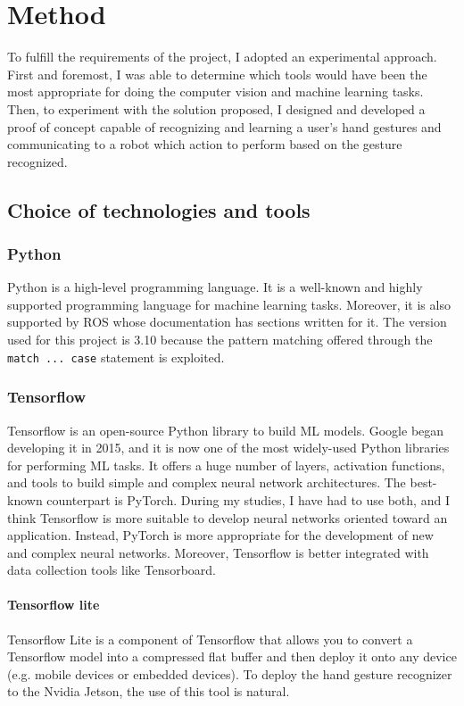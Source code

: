 \documentclass[../thesis.tex]{subfiles}
\begin{document}
\chapter{Method}\label{cap:methods}
To fulfill the requirements of the project, I adopted an experimental approach. First and foremost, I was able to determine which tools would have been the most appropriate for doing the computer vision and machine learning tasks. Then, to experiment with the solution proposed, I designed and developed a proof of concept capable of recognizing and learning a user’s hand gestures and communicating to a robot which action to perform based on the gesture recognized. 
\section{Choice of technologies and tools}\label{sec:technologies_and_tolls}
\subsection{Python}
Python is a high-level programming language. It is a well-known and highly supported programming language for machine learning tasks. Moreover, it is also supported by \acrshort{ROS} whose documentation has sections written for it. The version used for this project is 3.10 because the pattern matching offered through the \texttt{match ... case} statement is exploited.

\subsection{Tensorflow}
Tensorflow is an open-source Python library to build \acrshort{ML} models. Google began developing it in 2015, and it is now one of the most widely-used Python libraries for performing \acrshort{ML} tasks. It offers a huge number of layers, activation functions, and tools to build simple and complex neural network architectures. The best-known counterpart is PyTorch. During my studies, I have had to use both, and I think Tensorflow is more suitable to develop neural networks oriented toward an application. Instead, PyTorch is more appropriate for the development of new and complex neural networks. Moreover, Tensorflow is better integrated with data collection tools like Tensorboard. 

\subsubsection{Tensorflow lite}
Tensorflow Lite is a component of Tensorflow that allows you to convert a Tensorflow model into a compressed flat buffer and then deploy it onto any device (e.g. mobile devices or embedded devices). To deploy the hand gesture recognizer to the Nvidia Jetson, the use of this tool is natural.
\end{document}
